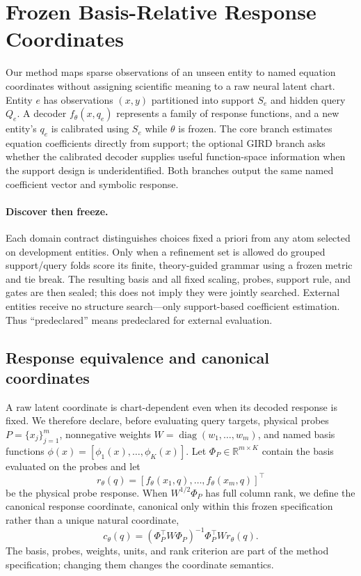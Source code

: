 \section{Frozen Basis-Relative Response Coordinates}
\label{sec:method}

Our method maps sparse observations of an unseen entity to named equation
coordinates without assigning scientific meaning to a raw neural latent chart.
Entity $e$ has observations $(x,y)$ partitioned into support $S_e$ and hidden
query $Q_e$.  A decoder $f_\theta(x,q_e)$ represents a family of response
functions, and a new entity's $q_e$ is calibrated using $S_e$ while $\theta$ is
frozen.  The core branch estimates equation coefficients directly from support;
the optional GIRD branch asks whether the calibrated decoder supplies useful
function-space information when the support design is underidentified.  Both
branches output the same named coefficient vector and symbolic response.

\paragraph{Discover then freeze.}
Each domain contract distinguishes choices fixed a priori from any atom selected
on development entities.  Only when a refinement set is allowed do grouped
support/query folds score its finite, theory-guided grammar using a frozen metric
and tie break.  The resulting basis and all fixed scaling, probes, support rule,
and gates are then sealed; this does not imply they were jointly searched.
External entities receive no structure search---only support-based coefficient
estimation.  Thus ``predeclared'' means predeclared for external evaluation.

\subsection{Response equivalence and canonical coordinates}

A raw latent coordinate is chart-dependent even when its decoded response is
fixed.  We therefore declare, before evaluating query targets, physical probes
$P=\{x_j\}_{j=1}^{m}$, nonnegative weights
$W=\operatorname{diag}(w_1,\ldots,w_m)$, and named basis functions
$\phi(x)=[\phi_1(x),\ldots,\phi_K(x)]$.  Let
$\Phi_P\in\mathbb{R}^{m\times K}$ contain the basis evaluated on the probes and
let
\begin{equation}
  r_\theta(q)=
  [f_\theta(x_1,q),\ldots,f_\theta(x_m,q)]^\top
\end{equation}
be the physical probe response.  When
$W^{1/2}\Phi_P$ has full column rank, we define the canonical response
coordinate, canonical only within this frozen specification rather than a
unique natural coordinate,
\begin{equation}
  c_\theta(q)
  = (\Phi_P^\top W\Phi_P)^{-1}\Phi_P^\top W r_\theta(q).
  \label{eq:canonical-coordinate}
\end{equation}
The basis, probes, weights, units, and rank criterion are part of the method
specification; changing them changes the coordinate semantics.

